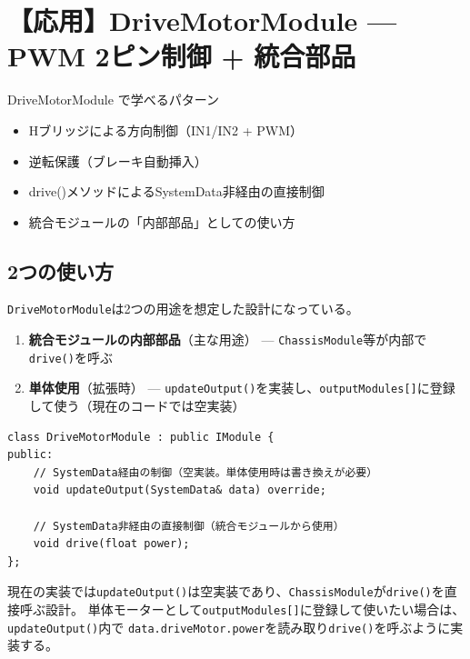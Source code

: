\section{【応用】DriveMotorModule — PWM 2ピン制御 + 統合部品}

\begin{patternbox}{DriveMotorModule で学べるパターン}
\begin{itemize}
    \item Hブリッジによる方向制御（IN1/IN2 + PWM）
    \item 逆転保護（ブレーキ自動挿入）
    \item drive()メソッドによるSystemData非経由の直接制御
    \item 統合モジュールの「内部部品」としての使い方
\end{itemize}
\end{patternbox}

\subsection{2つの使い方}

\texttt{DriveMotorModule}は2つの用途を想定した設計になっている。

\begin{enumerate}
    \item \textbf{統合モジュールの内部部品}（主な用途） — \texttt{ChassisModule}等が内部で\texttt{drive()}を呼ぶ
    \item \textbf{単体使用}（拡張時） — \texttt{updateOutput()}を実装し、\texttt{outputModules[]}に登録して使う（現在のコードでは空実装）
\end{enumerate}

\begin{lstlisting}[style=cppstyle, caption={DriveMotorModule.h — drive()メソッド}]
class DriveMotorModule : public IModule {
public:
    // SystemData経由の制御（空実装。単体使用時は書き換えが必要）
    void updateOutput(SystemData& data) override;

    // SystemData非経由の直接制御（統合モジュールから使用）
    void drive(float power);
};
\end{lstlisting}

\begin{pointbox}
現在の実装では\texttt{updateOutput()}は空実装であり、\texttt{ChassisModule}が\texttt{drive()}を直接呼ぶ設計。
単体モーターとして\texttt{outputModules[]}に登録して使いたい場合は、\texttt{updateOutput()}内で
\texttt{data.driveMotor.power}を読み取り\texttt{drive()}を呼ぶように実装する。
\end{pointbox}

